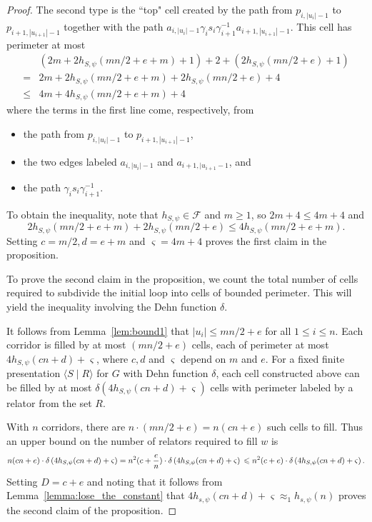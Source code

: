 \documentclass[11pt]{amsart}
\newcommand{\cC}{\varsigma}
\newcommand{\approxF}{\approx_1}
\theoremstyle{definition}
\newcommand\F{\mathcal F}
\renewcommand{\geq}{\geqslant} \renewcommand{\leq}{\leqslant} \renewcommand{\ge}{\geqslant} \renewcommand{\le}{\leqslant}
\begin{document}
\begin{proof}
The second type is the ``top" cell created by the path from $p_{i,|u_i|-1}$ to $p_{i+1,|u_{i+1}|-1}$ together with the path
$a_{i,|u_i|-1}\gamma_is_i\gamma_{i+1}^{-1}a_{i+1,|u_{i+1}|-1}$.
This cell has perimeter at most \[\begin{array}{lll}
&
(2m+2h_{S,\psi}(mn/2+e+m)+1)+2+(  2h_{S,\psi}(mn/2+e)+1)\\
=& 2m+2h_{S,\psi}(mn/2+e+m)+2h_{S,\psi}(mn/2+e)+4\\
\leq & 4m +4h_{S,\psi}(mn/2+e+m)+4\end{array}\]
where the terms in the first line come, respectively, from
\begin{itemize}[itemsep=5pt]
    \item the path from $p_{i,|u_i|-1}$ to $p_{i+1,|u_{i+1}|-1}$,
    \item the two edges labeled $a_{i,|u_i|-1}$ and $a_{i+1,|u_{i+1}-1}$, and
    \item the path $\gamma_is_i\gamma_{i+1}^{-1}$.
\end{itemize}
To obtain the inequality, note that $h_{S,\psi}\in \F$ and $m\geq 1$, so $2m+4\leq 4m+4$ and \[2h_{S,\psi}(mn/2+e+m)+2h_{S,\psi}(mn/2+e)\leq 4h_{S,\psi}(mn/2+e+m).\]
Setting $c=m/2, d=e+m$ and $\cC=4m+4$ proves the first claim in the proposition.

To prove the second claim in the proposition, we count the total number of cells required to subdivide the initial loop into cells of bounded perimeter.
This will yield the inequality involving the Dehn function $\delta$.

It follows from Lemma~\ref{lem:bound1} that $|u_i|\leq mn/2+e$
for all $1\leq i\leq n$.
Each corridor is filled by at most $(mn/2+e)$ cells, each of perimeter at most $4h_{S,\psi}(cn+d)+\cC$, where $c,d$ and $\cC$ depend on $m$ and $e$.
For  a fixed finite  presentation $\langle S\mid R\rangle$ for $G$ with Dehn function $\delta$, each cell constructed above can be filled by at most  $\delta(4h_{S,\psi}(cn+d)+\cC)$ cells with perimeter labeled by a relator from the set $R$.

With $n$ corridors, there are $n\cdot (mn/2+e)=n(cn+e)$ such cells to fill.
Thus an upper bound on the number of relators required to fill $w$ is
\begin{dmath*}
n(cn+e)\cdot \delta\left(4h_{S,\psi}(cn+d)+\cC\right)
=n^2(c+\frac{e}{n})\cdot \delta\left(4h_{S,\psi}(cn+d)+\cC\right)\\
\leq n^2(c+e)\cdot \delta\left(4h_{S,\psi}(cn+d)+\cC\right).
\end{dmath*}
Setting $D=c+e$
and noting that it follows from Lemma~\ref{lemma:lose_the_constant} that $4h_{s,\psi}(cn+d)+\cC\approxF h_{s,\psi}(n)$
proves the second claim of the proposition.
\end{proof}
\end{document}

